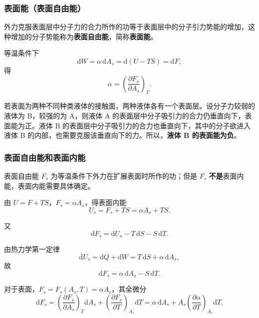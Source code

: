 \documentclass[UTF8]{ctexart}
\theoremstyle{definition}
\begin{document}
\subsubsection*{表面能（表面自由能）}

外力克服表面层中分子力的合力所作的功等于表面层中的分子引力势能的增加，这种增加的分子势能称为\textbf{表面自由能}，简称\textbf{表面能}。

等温条件下
\begin{equation}
\mathrm{d}W = \alpha\,\mathrm{d}A_s = \mathrm{d}(U-TS) = \mathrm{d}F,
\end{equation}
得
\begin{equation}
\alpha = \left(\frac{\partial F_s}{\partial A_s}\right)_T.
\end{equation}

若表面为两种不同种类液体的接触面，两种液体各有一个表面层。设分子力较弱的液体为 B，较强的为 A，则液体 A 的表面层中分子吸引力的合力仍垂直向下，表面能为正。液体 B 的表面层中分子吸引力的合力也垂直向下，其中的分子欲进入液体 B 的内部，也需要克服该垂直向下的力。所以，\textbf{液体 B 的表面能为负}。

\subsubsection*{表面自由能和表面内能}

表面自由能 $F_s$ 为等温条件下外力在扩展表面时所作的功；但是 $F_s$ \textbf{不是}表面内能，表面内能需要具体确定。

由 $U=F+TS$，$F_s=\alpha A_s$，得表面内能
\begin{equation}
U_s = F_s + TS = \alpha A_s + TS.
\end{equation}

又
\begin{equation}
\mathrm{d}F_s = \mathrm{d}U_s - T\,\mathrm{d}S - S\,\mathrm{d}T.
\end{equation}

由热力学第一定律
\begin{equation}
\mathrm{d}U_s = \mathrm{d}Q + \mathrm{d}W = T\,\mathrm{d}S + \alpha\,\mathrm{d}A_s,
\end{equation}
故
\begin{equation}
\mathrm{d}F_s = \alpha\,\mathrm{d}A_s - S\,\mathrm{d}T.
\end{equation}

对于表面，$F_s = F_s(A_s,T) = \alpha A_s$，其全微分
\begin{equation}
\mathrm{d}F_s = \left(\frac{\partial F_s}{\partial A_s}\right)_T\mathrm{d}A_s + \left(\frac{\partial F_s}{\partial T}\right)_{A_s}\mathrm{d}T
= \alpha\,\mathrm{d}A_s + A_s\left(\frac{\partial\alpha}{\partial T}\right)_{A_s}\mathrm{d}T.
\end{equation}
\end{document}
